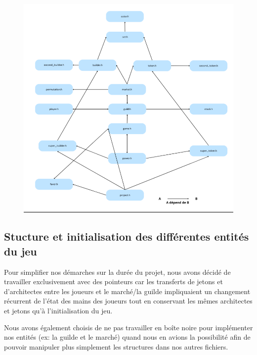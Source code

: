 \documentclass{article}
\begin{document}
    \begin{figure}
    \centering
    \includegraphics[scale=0.60]{dependance.png}
    \label{orga}

\end{figure}

    
    
    \subsection{Stucture et initialisation des différentes entités du jeu}
    \vspace{1em}
    \hspace{1em} Pour simplifier nos démarches sur la durée du projet, nous avons décidé de travailler exclusivement avec des pointeurs car les transferts de jetons et d'architectes entre les joueurs et le marché/la guilde impliquaient un changement récurrent de l'état des mains des joueurs tout en conservant les mêmes architectes et jetons qu'à l'initialisation du jeu.

    \hspace{1em} Nous avons également choisis de ne pas travailler en boîte noire pour implémenter nos entités (ex: la guilde et le marché) quand nous en avions la possibilité afin de pouvoir manipuler plus simplement les structures dans nos autres fichiers.
\end{document}
